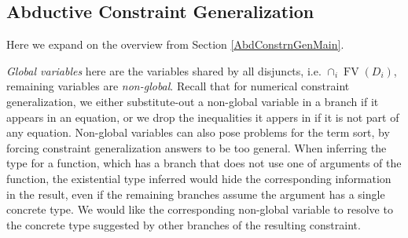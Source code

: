 \documentclass{article}
\newcommand{\tmem}[1]{{\em #1\/}}
\newcommand{\tmop}[1]{\ensuremath{\operatorname{#1}}}
\begin{document}
\subsection{Abductive Constraint Generalization}\label{AbdConstrnGenAlg}

Here we expand on the overview from Section \ref{AbdConstrnGenMain}.

{\tmem{Global variables}} here are the variables shared by all disjuncts, i.e.
$\cap_i \tmop{FV} (D_i)$, remaining variables are {\tmem{non-global}}. Recall
that for numerical constraint generalization, we either substitute-out a
non-global variable in a branch if it appears in an equation, or we drop the
inequalities it appers in if it is not part of any equation. Non-global
variables can also pose problems for the term sort, by forcing constraint
generalization answers to be too general. When inferring the type for a
function, which has a branch that does not use one of arguments of the
function, the existential type inferred would hide the corresponding
information in the result, even if the remaining branches assume the argument
has a single concrete type. We would like the corresponding non-global
variable to resolve to the concrete type suggested by other branches of the
resulting constraint.
\end{document}
